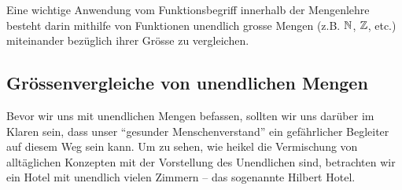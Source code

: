 Eine wichtige Anwendung vom Funktionsbegriff innerhalb der Mengenlehre besteht darin mithilfe von Funktionen unendlich grosse Mengen (z.B. $\mathbb{N}$, $\mathbb{Z}$, etc.) miteinander bezüglich ihrer Grösse zu vergleichen.

\subsection{Grössenvergleiche von unendlichen Mengen}

Bevor wir uns mit unendlichen Mengen befassen, sollten wir uns darüber im Klaren sein, dass unser ``gesunder Menschenverstand'' ein gefährlicher Begleiter auf diesem Weg sein kann. Um zu sehen, wie heikel die Vermischung von alltäglichen Konzepten mit der Vorstellung des Unendlichen sind, betrachten wir ein Hotel mit unendlich vielen Zimmern -- das sogenannte Hilbert Hotel.
